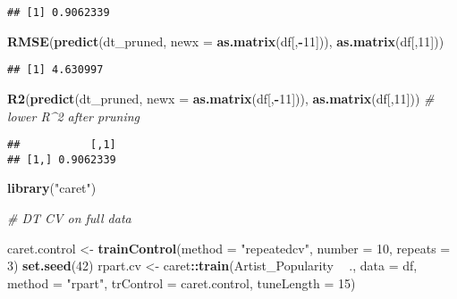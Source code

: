 \documentclass[
]{article}
\newenvironment{Shaded}{\begin{snugshade}}{\end{snugshade}}
\newcommand{\CommentTok}[1]{\textcolor[rgb]{0.56,0.35,0.01}{\textit{#1}}}
\newcommand{\DataTypeTok}[1]{\textcolor[rgb]{0.13,0.29,0.53}{#1}}
\newcommand{\DecValTok}[1]{\textcolor[rgb]{0.00,0.00,0.81}{#1}}
\newcommand{\KeywordTok}[1]{\textcolor[rgb]{0.13,0.29,0.53}{\textbf{#1}}}
\newcommand{\NormalTok}[1]{#1}
\newcommand{\OperatorTok}[1]{\textcolor[rgb]{0.81,0.36,0.00}{\textbf{#1}}}
\newcommand{\StringTok}[1]{\textcolor[rgb]{0.31,0.60,0.02}{#1}}
\begin{document}
\begin{verbatim}
## [1] 0.9062339
\end{verbatim}

\begin{Shaded}
\begin{Highlighting}[]
\KeywordTok{RMSE}\NormalTok{(}\KeywordTok{predict}\NormalTok{(dt_pruned, }\DataTypeTok{newx =} \KeywordTok{as.matrix}\NormalTok{(df[,}\OperatorTok{-}\DecValTok{11}\NormalTok{])), }\KeywordTok{as.matrix}\NormalTok{(df[,}\DecValTok{11}\NormalTok{]))}
\end{Highlighting}
\end{Shaded}

\begin{verbatim}
## [1] 4.630997
\end{verbatim}

\begin{Shaded}
\begin{Highlighting}[]
\KeywordTok{R2}\NormalTok{(}\KeywordTok{predict}\NormalTok{(dt_pruned, }\DataTypeTok{newx =} \KeywordTok{as.matrix}\NormalTok{(df[,}\OperatorTok{-}\DecValTok{11}\NormalTok{])), }\KeywordTok{as.matrix}\NormalTok{(df[,}\DecValTok{11}\NormalTok{])) }\CommentTok{# lower R^2 after pruning}
\end{Highlighting}
\end{Shaded}

\begin{verbatim}
##           [,1]
## [1,] 0.9062339
\end{verbatim}

\begin{Shaded}
\begin{Highlighting}[]
\KeywordTok{library}\NormalTok{(}\StringTok{"caret"}\NormalTok{)}

\CommentTok{# DT CV on full data}

\NormalTok{caret.control <-}\StringTok{ }\KeywordTok{trainControl}\NormalTok{(}\DataTypeTok{method =} \StringTok{"repeatedcv"}\NormalTok{,}
                              \DataTypeTok{number =} \DecValTok{10}\NormalTok{,}
                              \DataTypeTok{repeats =} \DecValTok{3}\NormalTok{)}
\KeywordTok{set.seed}\NormalTok{(}\DecValTok{42}\NormalTok{)}
\NormalTok{rpart.cv <-}\StringTok{ }\NormalTok{caret}\OperatorTok{::}\KeywordTok{train}\NormalTok{(Artist_Popularity }\OperatorTok{~}\StringTok{ }\NormalTok{., }
                         \DataTypeTok{data =}\NormalTok{ df,}
                         \DataTypeTok{method =} \StringTok{"rpart"}\NormalTok{,}
                         \DataTypeTok{trControl =}\NormalTok{ caret.control,}
                         \DataTypeTok{tuneLength =} \DecValTok{15}\NormalTok{)}
\end{Highlighting}
\end{Shaded}
\end{document}
